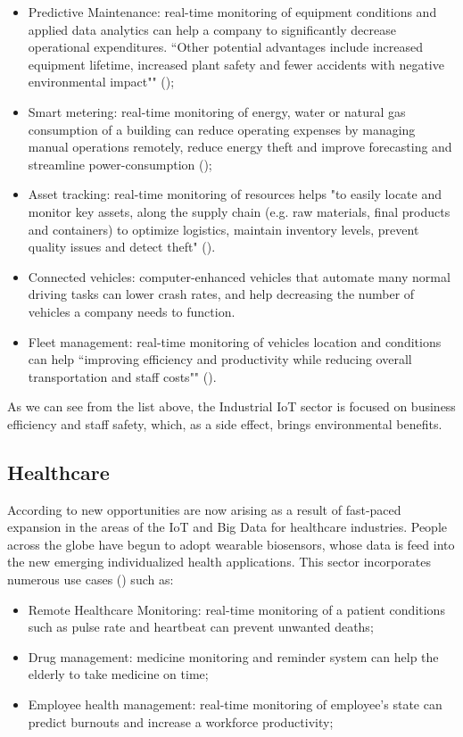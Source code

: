 \begin{itemize}
    \item Predictive Maintenance: real-time monitoring of equipment conditions and applied data analytics can help a company to significantly decrease operational expenditures. ``Other potential advantages include increased equipment lifetime, increased plant safety and fewer accidents with negative environmental impact"" (\cite{iiot-cases});
    \item Smart metering: real-time monitoring of energy, water or natural gas consumption of a building can reduce operating expenses by managing manual operations remotely, reduce energy theft and improve forecasting and streamline power-consumption (\cite{metering-sierra});
    \item Asset tracking: real-time monitoring of resources helps "to easily locate and monitor key assets, along the supply chain (e.g. raw materials, final products and containers) to optimize logistics, maintain inventory levels, prevent quality issues and detect theft" (\cite{iiot-cases}).
    \item Connected vehicles: computer-enhanced vehicles that automate many normal driving tasks can lower crash rates, and help decreasing the number of vehicles a company needs to function.
    \item Fleet management: real-time monitoring of vehicles location and conditions can help ``improving efficiency and productivity while reducing overall transportation and staff costs"" (\cite{iiot-cases}).
\end{itemize}

As we can see from the list above, the Industrial \gls{IoT} sector is focused on business efficiency and staff safety, which, as a side effect, brings environmental benefits.

\subsection{Healthcare}
\label{subsec:stateofart:areas:healthcare}

According to \cite{FIROUZI2018583} new opportunities are now arising as a result of fast-paced expansion in the areas of the \gls{IoT} and Big Data for healthcare industries. People across the globe have begun to adopt wearable biosensors, whose data is feed into the new emerging individualized health applications.
This sector incorporates numerous use cases (\cite{iot-healthcare}) such as:

\begin{itemize}
    \item Remote Healthcare Monitoring: real-time monitoring of a patient conditions such as pulse rate and heartbeat can prevent unwanted deaths;
    \item Drug management: medicine monitoring and reminder system can help the elderly to take medicine on time;
    \item Employee health management: real-time monitoring of employee's state can predict burnouts and increase a workforce productivity;
\end{itemize}

